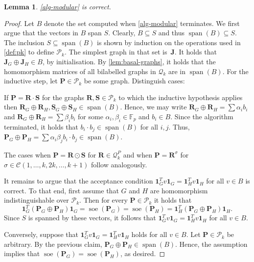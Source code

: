 \documentclass[11pt,a4paper]{article}
\theoremstyle{plain}
\newtheorem{lem}[thm]{Lemma}
\theoremstyle{remark}
\theoremstyle{definition}
\DeclareMathOperator{\soe}{soe}
\DeclareMathOperator{\spn}{span}
\newcommand{\cyclicpermutations}{\mathscr{C}(1,\dots, k, 2k, \dots, k+1)}
\begin{document}
\begin{lem}
    \cref{alg-modular} is correct.
\end{lem}
\begin{proof}
    Let $B$ denote the set computed when \cref{alg-modular} terminates.
    We first argue that the vectors in $B$ span $S$.
    Clearly, $B \subseteq S$ and thus $\spn(B)\subseteq S$.
    The inclusion $S \subseteq \spn(B)$ 
    is shown by induction on the operations used in \cref{def:pk} to define $\mathcal{P}_k$.
    The simplest graph in that set is~$\boldsymbol{J}$.
    It holds that $\boldsymbol{J}_G \oplus \boldsymbol{J}_H \in B$, by initialisation.
    By \cref{lem:basal-graphs}, it holds that the homomorphism matrices of all bilabelled graphs in $\mathcal{Q}_k$ are in $\spn(B)$.
    For the inductive step, let $\boldsymbol{P} \in \mathcal{P}_k$ be some graph. Distinguish cases:

    If $\boldsymbol{P} = \boldsymbol{R} \cdot \boldsymbol{S}$ for the graphs $\boldsymbol{R}, \boldsymbol{S} \in \mathcal{P}_k$ 
    to which the inductive hypothesis applies then $\boldsymbol{R}_G \oplus \boldsymbol{R}_H, \boldsymbol{S}_G \oplus \boldsymbol{S}_H \in \spn(B)$.
    Hence, we may write $\boldsymbol{R}_G \oplus \boldsymbol{R}_H = \sum \alpha_i b_i$ and  $\boldsymbol{R}_G \oplus \boldsymbol{R}_H = \sum \beta_i b_i$ for some $\alpha_i, \beta_i \in \mathbb{F}_p$ and $b_i \in B$.
    Since the algorithm terminated, it holds that $b_i \cdot b_j \in \spn(B)$ for all $i,j$. 
    Thus, $\boldsymbol{P}_G \oplus \boldsymbol{P}_H = \sum \alpha_i \beta_j b_i \cdot b_j \in \spn(B)$.

    The cases when $\boldsymbol{P} = \boldsymbol{R} \odot \boldsymbol{S}$ for $\boldsymbol{R} \in \mathcal{Q}_k^P$ and when $\boldsymbol{P} = \boldsymbol{R}^\sigma$ for $\sigma \in \cyclicpermutations$ follow analogously.

    It remains to argue that the acceptance condition $\boldsymbol{1}_G^T v \boldsymbol{1}_G = \boldsymbol{1}_H^Tv \boldsymbol{1}_H$ for all $v \in B$  is correct.
    To that end, first assume that $G$ and $H$ are homomorphism indistinguishable over $\mathcal{P}_k$.
    Then for every $\boldsymbol{P} \in \mathcal{P}_k$ it holds that
    \[
         \boldsymbol{1}_G^T (\boldsymbol{P}_G \oplus \boldsymbol{P}_H) \boldsymbol{1}_G   
        = \soe(\boldsymbol{P}_G) 
        = \soe(\boldsymbol{P}_H)
        = \boldsymbol{1}_H^T (\boldsymbol{P}_G \oplus \boldsymbol{P}_H) \boldsymbol{1}_H.  
    \]
    Since $S$ is spanned by these vectors, it follows that $\boldsymbol{1}_G^T v \boldsymbol{1}_G = \boldsymbol{1}_H^Tv \boldsymbol{1}_H$ for all $v \in B$.

    Conversely, suppose that $\boldsymbol{1}_G^T v \boldsymbol{1}_G = \boldsymbol{1}_H^Tv \boldsymbol{1}_H$  holds for all $v \in B$.
    Let $\boldsymbol{P} \in \mathcal{P}_k$ be arbitrary.
    By the previous claim, $\boldsymbol{P}_G \oplus \boldsymbol{P}_H \in \spn(B)$.
    Hence, the assumption implies that $\soe(\boldsymbol{P}_G) = \soe(\boldsymbol{P}_H)$, as desired.
\end{proof}
\end{document}
